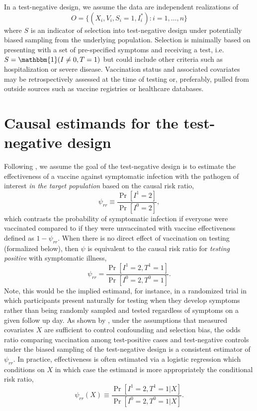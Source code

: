 \documentclass[11pt]{article}
\begin{document}
In a test-negative design, we assume the data are independent realizations of 
$$O = \{(X_i, V_i, S_i = 1, I^*_i) : i = 1, \ldots, n\}$$
where $S$ is an indicator of selection into test-negative design under potentially biased sampling from the underlying population. Selection is minimally based on presenting with a set of pre-specified symptoms and receiving a test, i.e. $S = \mathbbm{1}(I \neq 0, T = 1)$ but could include other criteria such as hospitalization or severe disease. Vaccination status and associated covariates may be retrospectively assessed at the time of testing or, preferably, pulled from outside sources such as vaccine registries or healthcare databases. 

\section{Causal estimands for the test-negative design} \label{sec:estimands}
Following  \cite{schnitzer_estimands_2022}, we assume the goal of the test-negative design is to estimate the effectiveness of a vaccine against symptomatic infection with the pathogen of interest \textit{in the target population} based on the causal risk ratio,
\begin{equation*}
    \psi_{rr} \equiv \dfrac{\Pr[I^1 = 2]}{\Pr[I^0 = 2]},
\end{equation*}
which contrasts the probability of symptomatic infection if everyone were vaccinated compared to if they were unvaccinated with vaccine effectiveness defined as $1 - \psi_{rr}$. When there is no direct effect of vaccination on testing (formalized below), then $\psi$ is equivalent to the causal risk ratio for \textit{testing positive} with symptomatic illness,
\begin{equation*}
    \psi_{rr} = \dfrac{\Pr[I^1 = 2, T^1 = 1]}{\Pr[I^0 = 2, T^0 = 1]}.
\end{equation*}
Note, this would be the implied estimand, for instance, in a randomized trial in which participants present naturally for testing when they develop symptoms rather than being randomly sampled and tested regardless of symptoms on a given follow up day. As shown by , under the assumptions that measured covariates $X$ are sufficient to control confounding and selection bias, the odds ratio comparing vaccination among test-positive cases and test-negative controls under the biased sampling of the test-negative design is a consistent estimator of $\psi_{rr}$. In practice, effectiveness is often estimated via a logistic regression which conditions on $X$ in which case the estimand is more appropriately the conditional risk ratio,
\begin{equation*}
    \psi_{rr}(X) \equiv \dfrac{\Pr[I^1 = 2, T^1 = 1 | X]}{\Pr[I^0 = 2, T^0 = 1 | X]}.
\end{equation*}
\end{document}
